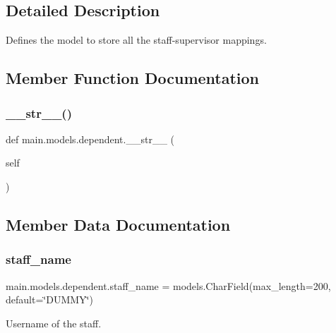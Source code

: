 \subsection{Detailed Description}
Defines the model to store all the staff-\/supervisor mappings. 

\subsection{Member Function Documentation}
\mbox{\label{classmain_1_1models_1_1dependent_a03bbd4008311076414605382595dd174}} 
\subsubsection{\texorpdfstring{\+\_\+\+\_\+str\+\_\+\+\_\+()}{\_\_str\_\_()}}
{\footnotesize\ttfamily def main.\+models.\+dependent.\+\_\+\+\_\+str\+\_\+\+\_\+ (\begin{DoxyParamCaption}\item[{}]{self }\end{DoxyParamCaption})}



\subsection{Member Data Documentation}
\mbox{\label{classmain_1_1models_1_1dependent_a73f6cd97e7cabd931b7d543ac1fb04ba}} 
\subsubsection{\texorpdfstring{staff\+\_\+name}{staff\_name}}
{\footnotesize\ttfamily main.\+models.\+dependent.\+staff\+\_\+name = models.\+Char\+Field(max\+\_\+length=200, default=\char`\"{}D\+U\+M\+MY\char`\"{})\hspace{0.3cm}{\ttfamily [static]}}



Username of the staff. 

